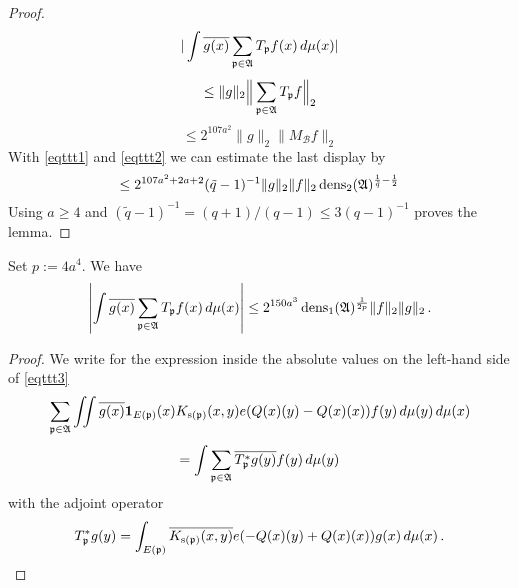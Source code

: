 {\begin{proof}
 \begin{equation}
     |\int \overline{g(x)} \sum_{{\mathfrak p} \in \mathfrak{A}} T_{{\mathfrak p}} f(x)\, d\mu(x)|
\end{equation}
 \begin{equation}
     \le \|g\|_2 \Big\| \sum_{{\mathfrak p} \in \mathfrak{A}} T_{{\mathfrak p}} f \Big\|_2
\end{equation}
 \begin{equation}
     \le 2^{107a^2}\|g\|_2 \|  M_{\mathcal{B}}f \|_2
\end{equation}
With \eqref{eqttt1} and
\eqref{eqttt2} we can estimate the last display by
\begin{equation}
    \le 2^{107a^2+2a+2}(\tilde{q}-1)^{-1} \|g\|_2 \|f\|_2\operatorname{\operatorname{dens}}_2(\mathfrak{A})^{\frac 1{\tilde{q}}-\frac 12}
\end{equation}
Using $a\ge 4$ and
$(\tilde q - 1)^{-1} = (q+1)/(q-1) \le 3(q-1)^{-1}$
proves the lemma.
\end{proof}


\begin{lemma}\label{dens1-antichain}
Set $p:=4a^4$. We have
    \begin{equation}\label{eqttt3}
  \left|\int \overline{g(x)} \sum_{{\mathfrak p} \in \mathfrak{A}} T_{{\mathfrak p}} f(x)\, d\mu(x)\right|\le
   2^{150a^3}\operatorname{\operatorname{dens}}_1(\mathfrak{A})^{\frac 1{2p}} \|f\|_2\|g\|_2\,.
\end{equation}
\end{lemma}



\begin{proof}

 We write for the expression inside the absolute values on the left-hand side of \eqref{eqttt3}
\begin{equation}
  \sum_{{\mathfrak p} \in \mathfrak{A}}\iint \overline{g(x)} \mathbf{1}_{E({\mathfrak p})}(x)
  {K_{{\mathrm{s}}({\mathfrak p})}(x,y)}e({Q}(x)(y) -
   {Q}(x)(x))
   f(y)\, d\mu(y)\,d\mu(x)
\end{equation}
\begin{equation}
  =\int \sum_{{\mathfrak p} \in \mathfrak{A}} \overline{T_{{\mathfrak p}} ^*g(y)}   f(y)\, d\mu(y)
\end{equation}
with the adjoint operator
\begin{equation}\label{eq-tstarwritten}
    T_{{\mathfrak p}}^*g(y)=\int_{E({\mathfrak p})} \overline{K_{{\mathrm{s}}({\mathfrak p})}(x,y)}e(-{Q}(x)(y)+
    {Q}(x)(x))g(x)\, d\mu(x)\, .
\end{equation}






\end{proof}}
